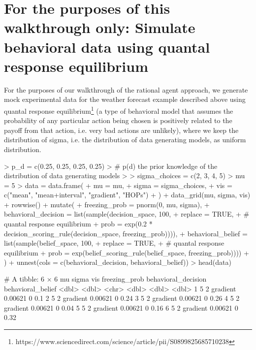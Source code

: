 \documentclass{article}
\begin{document}
\section{For the purposes of this walkthrough only: Simulate behavioral data using quantal response equilibrium}

For the purposes of our walkthrough of the rational agent approach, we generate mock experimental data for the weather forecast example described above using quantal response equilibrium\footnote{https://www.sciencedirect.com/science/article/pii/S0899825685710238} (a type of behavioral model that assumes the probability of any particular action being chosen is positively related to the payoff from that action, i.e. very bad actions are unlikely), where we keep the distribution of sigma, i.e. the distribution of data generating models, as uniform distribution.

\begin{Schunk}
\begin{Sinput}
> p_d = c(0.25, 0.25, 0.25, 0.25)
> # p(d) the prior knowledge of the distribution of data generating models
> 
> sigma_choices = c(2, 3, 4, 5)
> mu = 5
> data = data.frame(
+   mu = mu, 
+   sigma = sigma_choices,
+   vis = c("mean", "mean+interval", "gradient", "HOPs")
+ ) %>% 
+   data_grid(mu, sigma, vis) %>% 
+   rowwise() %>%
+   mutate(
+     freezing_prob = pnorm(0, mu, sigma),
+     behavioral_decision = list(sample(decision_space, 100, 
+       replace = TRUE, 
+       # quantal response equilibrium
+       prob = exp(0.2 * decision_scoring_rule(decision_space, freezing_prob)))),
+     behavioral_belief = list(sample(belief_space, 100, 
+       replace = TRUE, 
+       # quantal response equilibrium
+       prob = exp(belief_scoring_rule(belief_space, freezing_prob))))
+   ) %>%
+   unnest(cols = c(behavioral_decision, behavioral_belief))
> head(data)
\end{Sinput}
\begin{Soutput}
# A tibble: 6 × 6
     mu sigma vis      freezing_prob behavioral_decision behavioral_belief
  <dbl> <dbl> <chr>            <dbl>               <dbl>             <dbl>
1     5     2 gradient       0.00621                   0              0.1 
2     5     2 gradient       0.00621                   0              0.24
3     5     2 gradient       0.00621                   0              0.26
4     5     2 gradient       0.00621                   0              0.04
5     5     2 gradient       0.00621                   0              0.16
6     5     2 gradient       0.00621                   0              0.32
\end{Soutput}
\end{Schunk}
\end{document}
